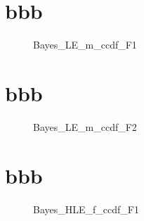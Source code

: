 \documentclass[a4j,11pt,mc]{jreport}
\begin{document}
\section{bbb}
\begin{figure}[h!]
	\begin{center}
			\caption{Bayes\_LE\_m\_ccdf\_F1}
	\end{center}
\end{figure}

\section{bbb}
\begin{figure}[h!]
	\begin{center}
			\caption{Bayes\_LE\_m\_ccdf\_F2}
	\end{center}
\end{figure}



\section{bbb}
\begin{figure}[h!]
	\begin{center}
			\caption{Bayes\_HLE\_f\_ccdf\_F1}
	\end{center}
\end{figure}
\end{document}
